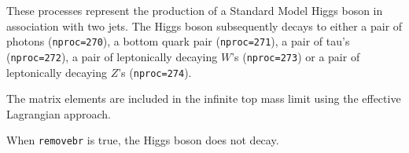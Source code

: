 
These processes represent the production of a Standard Model Higgs boson
in association with two jets. The Higgs boson
subsequently decays to either a pair of photons ({\tt nproc=270}), a bottom quark pair ({\tt nproc=271}),
a pair of tau's ({\tt nproc=272}), a pair of leptonically decaying $W$'s ({\tt nproc=273})
or a pair of leptonically decaying $Z$'s ({\tt nproc=274}).

The matrix elements are included in the infinite top mass limit
using the effective Lagrangian approach.

When {\tt removebr} is true, the Higgs boson does not decay.
